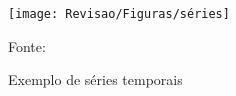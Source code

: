 \begin{figure}[H]
	\centering
	\caption{Exemplo de séries temporais}
	\label{fig:series}
	\texttt{[image: Revisao/Figuras/séries]}
	
	Fonte: \cite{brandão_2020}
\end{figure}

